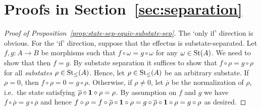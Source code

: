\documentclass[%
	submission,
copyright,creativecommons,UKenglish]{eptcs}
\begin{document}
\section{Proofs in Section~\ref{sec:separation}}
\label{app:proofs-separation-section}

\begin{proof}[Proof of Proposition~\ref{prop:state-sep-equiv-substate-sep}]
The `only if' direction is obvious.
For the `if' direction,
suppose that the effectus is substate-separated.
Let $f,g\colon A\to B$ be morphisms
such that $f\circ \omega=g\circ \omega$
for any $\omega\in\mathrm{St}(A)$.
We need to show that then $f=g$.
By substate separation it suffices to show that $f\circ \rho = g\circ \rho$ for all \emph{substates} $\rho\in\mathrm{St}_{\le}(A)$.
Hence, let $\rho\in\mathrm{St}_{\le}(A)$ be an arbitrary substate.
If $\rho=0$, then $f\circ\rho=0=g\circ \rho$.
Otherwise, if $\rho\neq 0$, let $\overline{\rho}$ be the normalization
of $\rho$, i.e.\ the state satisfying
$\overline{\rho}\circ \mathbf{1}\circ \rho=\rho$.
By assumption on $f$ and $g$ we have $f\circ \overline{\rho} = g\circ\overline{\rho}$ and hence
$
f\circ \rho = f\circ \overline{\rho}\circ \mathbf{1}\circ \rho
= g\circ \overline{\rho}\circ \mathbf{1}\circ \rho
= g\circ \rho
$
as desired.
\end{proof}
\end{document}
